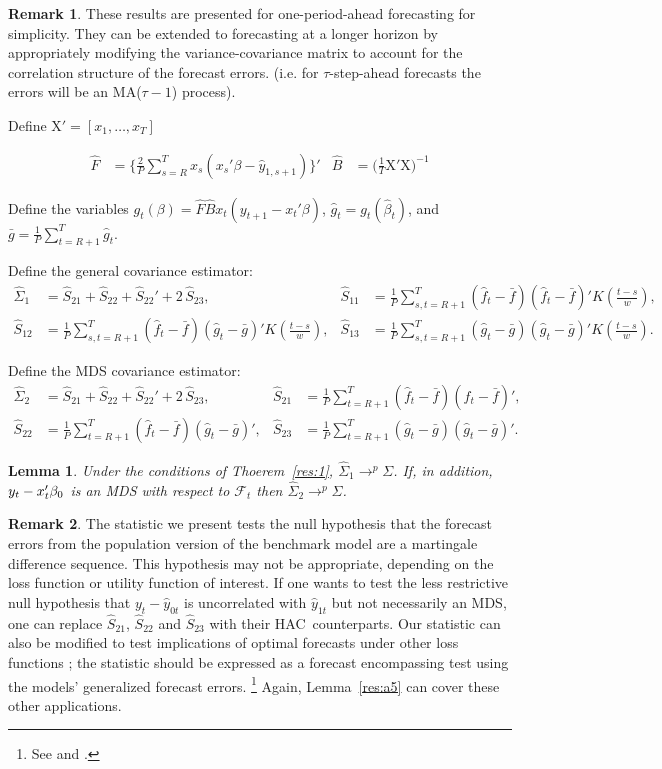 \documentclass[12pt,fleqn]{article}
\newtheorem{lem}[thm]{Lemma}
\theoremstyle{definition}
\newtheorem{rem}{Remark}
\newcommand{\Bh}{\hat{B}}
\newcommand{\btrue}[1][]{\if#1*\hat\beta_{T+1}\else\beta_0\fi}
\newcommand{\bh}{\hat{\beta}}
\newcommand{\Fh}{\hat{F}}
\newcommand{\Fs}{\mathcal{F}}
\newcommand{\fb}{\bar{f}}
\newcommand{\fh}{\hat{f}}
\newcommand{\gb}{\bar{g}}
\newcommand{\gh}{\hat{g}}
\newcommand{\Sh}{\hat{S}}
\newcommand{\Sigmah}{\hat\Sigma}
\newcommand{\yh}{\hat{y}}
\newcommand{\X}{\ensuremath{\mathrm{X}}}
\newcommand{\osum}[1]{\sum_{#1=R+1}^T}
\newcommand{\oavg}[1]{\tfrac{1}{P} \osum{#1}}
\newcommand{\hac}{HAC}
\newcommand{\ma}{MA}
\newcommand{\mds}{MDS}
\begin{document}
\begin{rem}
  These results are presented for one-period-ahead forecasting for
  simplicity.  They can be extended to forecasting at a longer horizon
  by appropriately modifying the variance-covariance matrix to account
  for the correlation structure of the forecast errors. (i.e. for
  $\tau$-step-ahead forecasts the errors will be an \ma($\tau-1$) process).
\end{rem}

Define $\X' = [x_1,\dots,x_T]$

\begin{align*}
  \Fh &= \Big\{\tfrac{2}{P}\sum_{s=R}^T x_s (x_s'\beta - \yh_{1,s+1}) \Big\}' &
  \Bh &= \big(\tfrac1T \X'\X \big)^{-1}
\end{align*}

Define the variables
$g_t(\beta) = \Fh \Bh x_t(y_{t+1} - x_t'\beta)$,
$\gh_t = g_t(\bh_t)$, and $\gb = \oavg{t} \gh_t$.

\newcommand{\K}[1]{K(\tfrac{#1}{w})}

Define the general covariance estimator:
\begin{align*}
  \Sigmah_1 &= \Sh_{21} + \Sh_{22} + \Sh_{22}' + 2 \, \Sh_{23}, &
  \Sh_{11} &= \oavg{s,t} (\fh_t - \fb) (\fh_t - \fb)' \K{t-s}, \\
  \Sh_{12} &= \oavg{s,t} (\fh_t - \fb)(\gh_t - \gb)' \K{t-s}, &
  \Sh_{13} &= \oavg{s,t} (\gh_t - \gb)(\gh_t - \gb)'  \K{t-s}.
\end{align*}

Define the MDS covariance estimator:
\begin{align*}
  \Sigmah_2 &= \Sh_{21} + \Sh_{22} + \Sh_{22}' + 2 \, \Sh_{23}, &
  \Sh_{21} &= \oavg{t} (\fh_t - \fb) (\fh_t - \fb)', \\
  \Sh_{22} &= \oavg{t} (\fh_t - \fb)(\gh_t - \gb)', &
  \Sh_{23} &= \oavg{t} (\gh_t - \gb)(\gh_t - \gb)'.
\end{align*}

\begin{lem}\label{lem:2}
  Under the conditions of Thoerem~\ref{res:1}, $\Sigmah_1 \to^p
  \Sigma$. If, in addition, $y_t - x_t'\btrue$ is an MDS with respect
  to $\Fs_t$ then $\Sigmah_2 \to^p \Sigma$.
\end{lem}

\begin{rem}
  The statistic we present tests the null hypothesis that the forecast
  errors from the population version of the benchmark model are a
  martingale difference sequence.  This hypothesis may not be
  appropriate, depending on the loss function or utility function of
  interest.  If one wants to test the less restrictive null hypothesis that
  $y_{t} - \yh_{0t}$ is uncorrelated with $\yh_{1t}$ but not
  necessarily an \mds, one can replace $\Sh_{21}$, $\Sh_{22}$
  and $\Sh_{23}$ with their \hac\ counterparts.
  Our statistic can also be modified to test implications of
  optimal forecasts under other loss functions
  \citep[see][]{PaT:07,PaT:07b}; the statistic should be expressed as
  a forecast encompassing test using the models' generalized forecast
  errors.%
\footnote{See \citet{HLN:98} and \citet[Section~4]{ClW:07}.} %
  Again, Lemma~\ref{res:a5} can cover these other applications.
\end{rem}
\end{document}
